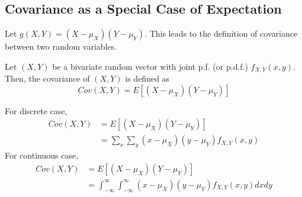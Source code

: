 \subsection{Covariance as a Special Case of Expectation}

Let $g(X,Y) = (X - \mu_X)(Y - \mu_Y)$. This leads to the definition of covariance between two random variables.

\begin{definition}[Covariance]
Let $(X,Y)$ be a bivariate random vector with joint p.f. (or p.d.f.) $f_{X,Y}(x,y)$. Then, the covariance of $(X,Y)$ is defined as
$$
Cov(X,Y) = E[(X - \mu_X)(Y - \mu_Y)]
$$
\end{definition}
For discrete case,
\begin{equation*}
\begin{split}
    Cov(X,Y) &= E[(X - \mu_X)(Y-\mu_Y)] \\
    &= \sum_x \sum_y (x - \mu_X)(y - \mu_Y) f_{X,Y}(x,y)
\end{split}
\end{equation*}
For continuous case,
\begin{equation*}
\begin{split}
    Cov(X,Y) &= E[(X - \mu_X)(Y-\mu_Y)] \\
    &= \int_{-\infty}^{\infty} \int_{-\infty}^{\infty}  (x - \mu_X)(y - \mu_Y) f_{X,Y}(x,y) dx dy
\end{split}
\end{equation*}

